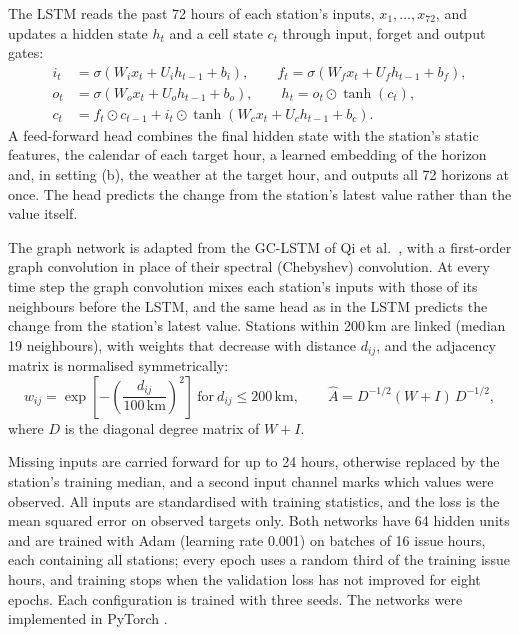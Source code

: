 The LSTM \cite{hochreiter1997lstm} reads the past 72 hours of each station's inputs, $x_1, \ldots,
x_{72}$, and updates a hidden state $h_t$ and a cell state $c_t$ through input, forget and output
gates:
\begin{equation}\label{eq:lstm}
\begin{aligned}
i_t &= \sigma(W_i x_t + U_i h_{t-1} + b_i), \qquad f_t = \sigma(W_f x_t + U_f h_{t-1} + b_f),\\
o_t &= \sigma(W_o x_t + U_o h_{t-1} + b_o), \qquad h_t = o_t \odot \tanh(c_t),\\
c_t &= f_t \odot c_{t-1} + i_t \odot \tanh(W_c x_t + U_c h_{t-1} + b_c).
\end{aligned}
\end{equation}
A feed-forward head combines the final hidden state with the station's static features, the
calendar of each target hour, a learned embedding of the horizon and, in setting (b), the weather
at the target hour, and outputs all 72 horizons at once. The head predicts the change from the
station's latest \pmtf{} value rather than the value itself.

The graph network is adapted from the GC-LSTM of Qi et al.\ \cite{qi2019gclstm}, with a first-order
graph convolution \cite{kipf2017gcn} in place of their spectral (Chebyshev) convolution. At every
time step the graph convolution mixes each station's inputs with those of its neighbours before the
LSTM, and the same head as in the LSTM predicts the change from the station's latest \pmtf{} value. Stations within 200\,km are linked (median 19 neighbours), with weights that decrease with
distance $d_{ij}$, and the adjacency matrix is normalised symmetrically:
\begin{equation}\label{eq:gcn}
w_{ij} = \exp\!\left[-\left(\frac{d_{ij}}{100\,\mathrm{km}}\right)^{2}\right] \ \text{for}\ d_{ij} \le 200\,\mathrm{km}, \qquad
\hat{A} = D^{-1/2}(W + I)\,D^{-1/2},
\end{equation}
where $D$ is the diagonal degree matrix of $W + I$.

Missing \pmtf{} inputs are carried forward for up to 24 hours, otherwise replaced by the station's
training median, and a second input channel marks which values were observed. All inputs are
standardised with training statistics, and the loss is the mean squared error on observed targets
only. Both networks have 64 hidden units and are trained with Adam (learning rate 0.001) on batches
of 16 issue hours, each containing all stations; every epoch uses a random third of the training
issue hours, and training stops when the validation loss has not improved for eight epochs. Each
configuration is trained with three seeds. The networks were implemented in PyTorch
\cite{paszke2019pytorch}.

